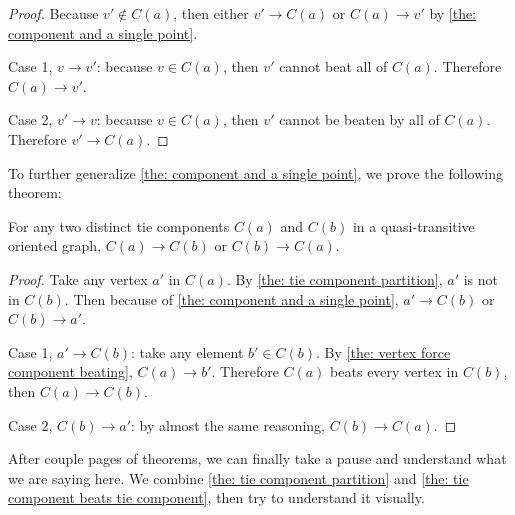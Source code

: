 \begin{proof}
  Because \(v' \notin C(a)\),
  then either \(v' \to C(a)\) or \(C(a) \to v'\)
  by \cref{the: component and a single point}.

  Case 1, \(v \to v'\): because \(v \in C(a)\),
  then \(v'\) cannot beat all of \(C(a)\).
  Therefore \(C(a) \to v'\).

  Case 2, \(v' \to v\): because \(v \in C(a)\),
  then \(v'\) cannot be beaten by all of \(C(a)\).
  Therefore \(v' \to C(a)\).
\end{proof}

To further generalize \cref{the: component and a single point},
we prove the following theorem:

\begin{theorem}\label{the: tie component beats tie component}
  For any two distinct tie components \(C(a)\) and \(C(b)\)
  in a quasi-transitive oriented graph,
  \(C(a) \to C(b)\) or \(C(b) \to C(a)\).
\end{theorem}

\begin{proof}
  Take any vertex \(a'\) in \(C(a)\).
  By \cref{the: tie component partition}, \(a'\) is not in \(C(b)\).
  Then because of \cref{the: component and a single point},
  \(a' \to C(b)\) or \(C(b) \to a'\).

  Case 1, \(a' \to C(b)\): take any element \(b' \in C(b)\).
  By \cref{the: vertex force component beating}, \(C(a) \to b'\).
  Therefore \(C(a)\) beats every vertex in \(C(b)\),
  then \(C(a) \to C(b)\).

  Case 2, \(C(b) \to a'\):
  by almost the same reasoning, \(C(b) \to C(a)\).
\end{proof}

After couple pages of theorems,
we can finally take a pause
and understand what we are saying here.
We combine \cref{the: tie component partition} and
\cref{the: tie component beats tie component},
then try to understand it visually.

